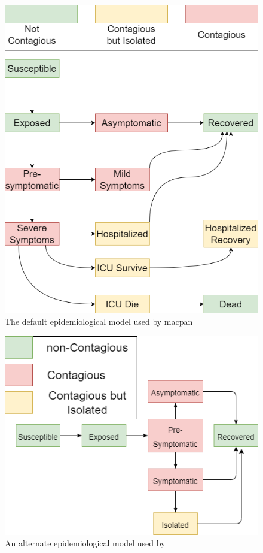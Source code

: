 \begin{appendices}
\begin{figure}
    \centering
    \includegraphics[width=\textwidth]{images/macpan_base_actual.png}
    \caption{The default epidemiological model used by macpan}
    \label{fig:macpan_base_epi}
\end{figure}

\begin{figure}
    \centering
    \includegraphics[width=\textwidth]{images/fieldshumphery.png}
    \caption{An alternate epidemiological model used by \cite{fields2021age}}
    \label{fig:fh_base_epi}
\end{figure}


\end{appendices}
